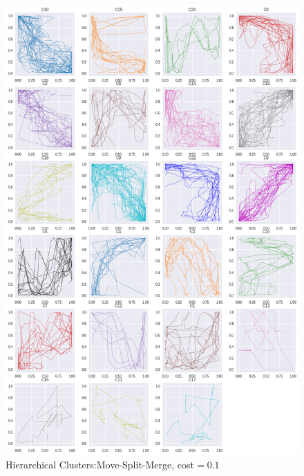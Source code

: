\begin{figure}[h]
  \centering
  \includegraphics[width=\linewidth,height=\textheight,keepaspectratio]{figs/clusters/CLU_H_ALL[MSM;c=.1].png}
  \caption{ Hierarchical Clusters:Move-Split-Merge, cost$=0.1$}
\end{figure}

